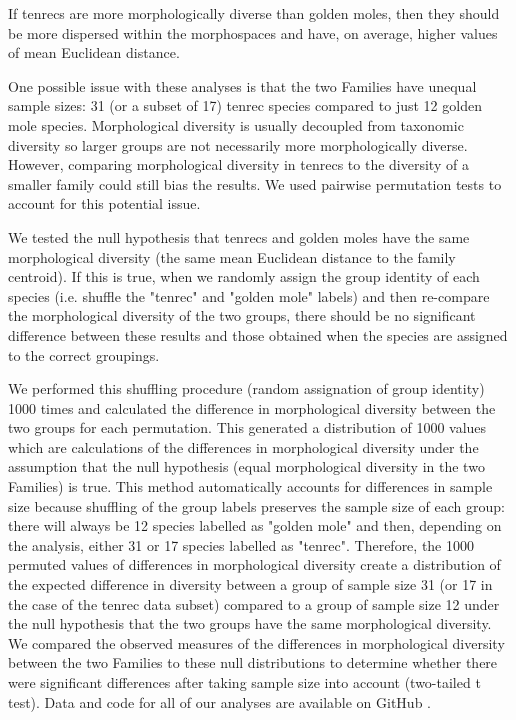 \documentclass[12pt,a4paper]{article}
\begin{document}
	If tenrecs are more morphologically diverse than golden moles, then they should be more dispersed within the morphospaces and have, on average, higher values of mean Euclidean distance. 	

	One possible issue with these analyses is that the two Families have unequal sample sizes: 31 (or a subset of 17) tenrec species compared to just 12 golden mole species. Morphological diversity is usually decoupled from taxonomic diversity \citep[e.g.][]{Ruta2013, Hopkins2013} so larger groups are not necessarily more morphologically diverse. However, comparing morphological diversity in tenrecs to the diversity of a smaller family could still bias the results. We used pairwise permutation tests to account for this potential issue. 

	We tested the null hypothesis that tenrecs and golden moles have the same morphological diversity (the same mean Euclidean distance to the family centroid). If this is true, when we randomly assign the group identity of each species (i.e. shuffle the "tenrec" and "golden mole" labels) and then re-compare the morphological diversity of the two groups, there should be no significant difference between these results and those obtained when the species are assigned to the correct groupings. 
	
	We performed this shuffling procedure (random assignation of group identity) 1000 times and calculated the difference in morphological diversity between the two groups for each permutation. This generated a distribution of 1000 values which are calculations of the differences in morphological diversity under the assumption that the null hypothesis (equal morphological diversity in the two Families) is true. This method automatically accounts for differences in sample size because shuffling of the group labels preserves the sample size of each group: there will always be 12 species labelled as "golden mole" and then, depending on the analysis, either 31 or 17 species labelled as "tenrec". Therefore, the 1000 permuted values of differences in morphological diversity create a distribution of the expected difference in diversity between a group of sample size 31 (or 17 in the case of the tenrec data subset) compared to a group of sample size 12 under the null hypothesis that the two groups have the same morphological diversity. We compared the observed measures of the differences in morphological diversity between the two Families to these null distributions to determine whether there were significant differences after taking sample size into account (two-tailed t test). Data and code for all of our analyses are available on GitHub \citep{Finlay2015c}.
\end{document}
